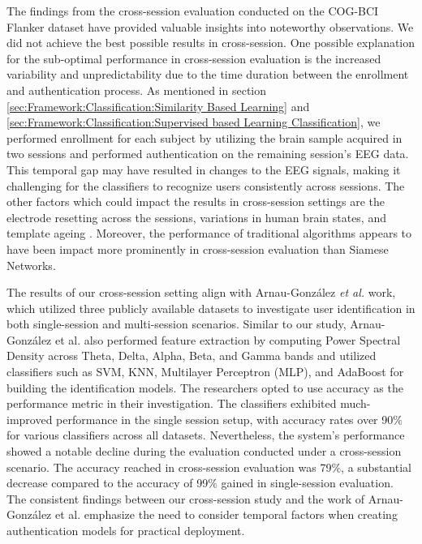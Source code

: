 The findings from the cross-session evaluation conducted on the COG-BCI Flanker dataset have provided valuable insights into noteworthy observations. We did not achieve the best possible results in cross-session. One possible explanation for the sub-optimal performance in cross-session evaluation is the increased variability and unpredictability due to the time duration between the enrollment and authentication process. As mentioned in section \ref{sec:Framework:Classification:Similarity Based Learning} and \ref{sec:Framework:Classification:Supervised based Learning Classification}, we performed enrollment for each subject by utilizing the brain sample acquired in two sessions and performed authentication on the remaining session's EEG data.
This temporal gap may have resulted in changes to the EEG signals, making it challenging for the classifiers to recognize users consistently across sessions. The other factors which could impact the results in cross-session settings are the electrode resetting across the sessions, variations in human brain states, and template ageing \cite{seha2020eeg}. Moreover, the performance of traditional algorithms appears to have been impact more prominently in cross-session evaluation than Siamese Networks.  
\smallskip

The results of our cross-session setting align with Arnau-González \textit{et al.} \cite{arnau2018influence} work, which utilized three publicly available datasets to investigate user identification in both single-session and multi-session scenarios. Similar to our study, Arnau-González et al. also performed feature extraction by computing Power Spectral Density across Theta, Delta, Alpha, Beta, and Gamma bands and utilized classifiers such as SVM, KNN, Multilayer Perceptron (MLP), and AdaBoost for building the identification models. The researchers opted to use accuracy as the performance metric in their investigation. The classifiers exhibited much-improved performance in the single session setup, with accuracy rates over 90$\%$ for various classifiers across all datasets. Nevertheless, the system's performance showed a notable decline during the evaluation conducted under a cross-session scenario. The accuracy reached in cross-session evaluation was 79$\%$, a substantial decrease compared to the accuracy of 99$\%$ gained in single-session evaluation. The consistent findings between our cross-session study and the work of Arnau-González et al. emphasize the need to consider temporal factors when creating authentication models for practical deployment.     

